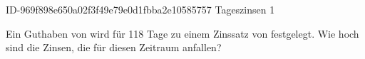\begin{exercise}
      {ID-969f898e650a02f3f49e79e0d1fbba2e10585757}
      {Tageszinsen 1}
  \ifproblem\problem\par
    Ein Guthaben von  wird für \num{118} Tage zu einem Zinssatz
    von  festgelegt. Wie hoch sind die Zinsen, die für diesen Zeitraum
    anfallen?
  \fi
\end{exercise}
